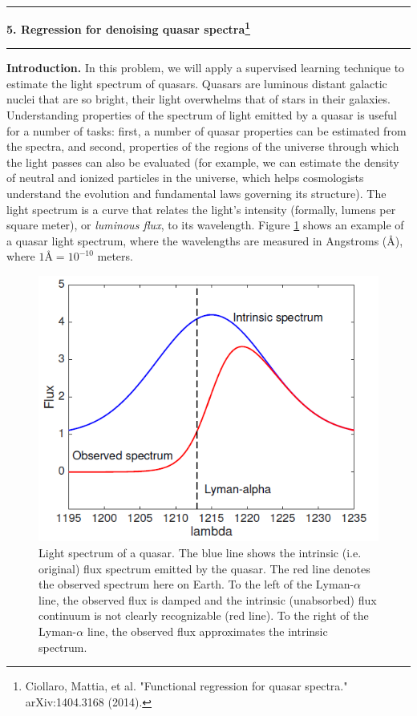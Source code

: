 \documentclass[11pt]{article}
\newcommand\question[2]{\vspace{.25in}\hrule\textbf{#1. #2}\vspace{.5em}\hrule\vspace{.10in}}
\begin{document}
\newpage
\question{5}{Regression for denoising quasar spectra\footnote{Ciollaro, Mattia, et al. "Functional regression for quasar spectra." arXiv:1404.3168 (2014).}}
\textbf{Introduction.} In this problem, we will apply a supervised learning technique to estimate the light spectrum of quasars. Quasars are luminous distant galactic nuclei that are so bright, their light overwhelms that of stars in their galaxies. Understanding properties of the spectrum of light emitted by a quasar is useful for a number of tasks: first, a number of quasar properties can be estimated from the spectra, and second, properties of the regions of the universe through which the light passes can also be evaluated (for example, we can estimate the density of neutral and ionized particles in the universe, which helps cosmologists understand the evolution and fundamental laws governing its structure). The light spectrum is a curve that relates the light's intensity (formally, lumens per square meter), or \emph{luminous flux}, to its wavelength. Figure \ref{pic} shows an example of a quasar light spectrum, where the wavelengths are measured in Angstroms ({\AA}), where $1{\text{\AA}}= 10^{-10}$ meters.
\begin{figure}[htbp]
  \centering
  \includegraphics{ps1pic}
  \caption{Light spectrum of a quasar. The blue line shows the intrinsic (i.e. original) flux spectrum emitted by the quasar. The red line denotes the observed spectrum here on Earth. To the left of the Lyman-$\alpha$ line, the observed
flux is damped and the intrinsic (unabsorbed) flux continuum is not clearly recognizable (red line). To the right of the Lyman-$\alpha$ line, the observed flux approximates the intrinsic spectrum.}\label{pic}
\end{figure}
\end{document}
